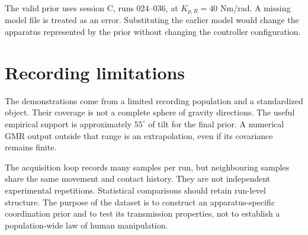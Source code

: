 The valid prior uses session C, runs 024--036, at $K_{p,R}=40$ Nm/rad. A missing model file is treated as an error. Substituting the earlier model would change the apparatus represented by the prior without changing the controller configuration.

\section{Recording limitations}

The demonstrations come from a limited recording population and a standardized object. Their coverage is not a complete sphere of gravity directions. The useful empirical support is approximately $55^\circ$ of tilt for the final prior. A numerical GMR output outside that range is an extrapolation, even if its covariance remains finite.

The acquisition loop records many samples per run, but neighbouring samples share the same movement and contact history. They are not independent experimental repetitions. Statistical comparisons should retain run-level structure. The purpose of the dataset is to construct an apparatus-specific coordination prior and to test its transmission properties, not to establish a population-wide law of human manipulation.

